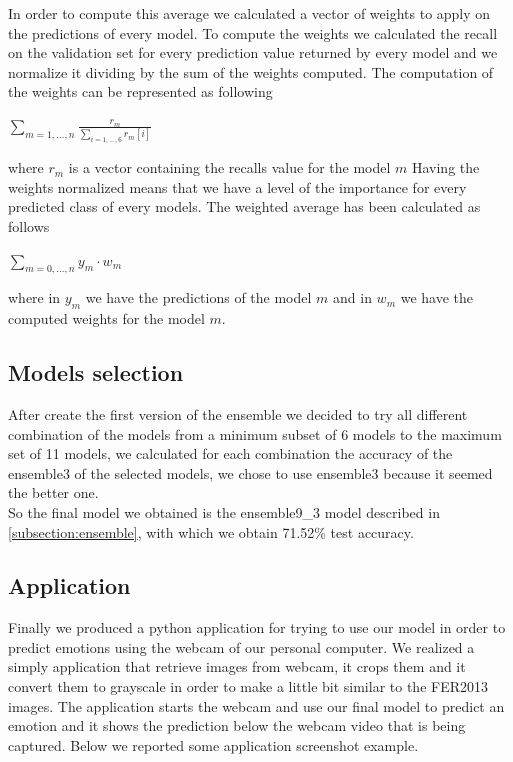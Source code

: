 \documentclass[10pt,twocolumn,letterpaper]{article}
\begin{document}
In order to compute this average we calculated a vector of weights to apply on the predictions of every model. To compute the weights we calculated the recall on the validation set for every prediction value returned by every model and we normalize it dividing by the sum of the weights computed.
The computation of the weights can be represented as following
\begin{center}
   $\sum_{m=1,...,n} \frac{r_{m}}{\sum_{i=1,...,6} r_{m}[i]}$
\end{center}
where $r_m$ is a vector containing the recalls value for the model $m$
Having the weights normalized means that we have a level of the importance for every predicted class of every models.
The weighted average has been calculated as follows
\begin{center}
   $\sum_{m=0,...,n} y_m\cdot w_m$
\end{center}
where in $y_m$ we have the predictions of the model $m$
and in $w_m$ we have the computed weights for the model $m$.

\subsection{Models selection}
After create the first version of the ensemble we decided to try all different combination of the models from a minimum subset of 6 models to the maximum set of 11 models, we calculated for each combination the accuracy of the ensemble3 of the selected models, we chose to use ensemble3 because it seemed the better one. 
\\So the final model we obtained is the ensemble9\_3 model described in \ref{subsection:ensemble}, with which we obtain 71.52\% test accuracy.
\subsection{Application}
Finally we produced a python application for trying to use our model in order to predict emotions using the webcam of our personal computer.
We realized a simply application that retrieve images from webcam, it crops them and it convert them to grayscale in order to make a little bit similar to the FER2013 images.
The application starts the webcam and use our final model to predict an emotion and it shows the prediction below the webcam video that is being captured. Below we reported some application screenshot example.
\end{document}
